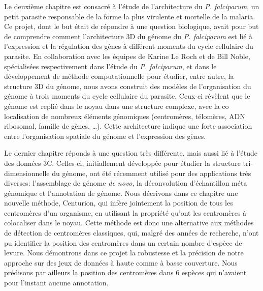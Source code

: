 \begin{resumes}
Le deuxième chapitre est consacré à l'étude de l'architecture du {\em P.
falciparum}, un petit parasite responsable de la forme la plus virulente et
mortelle de la malaria. Ce projet, dont le but était de répondre à une
question biologique, avait pour but de comprendre comment l'architecture 3D du
génome du {\em P. falciparum} est lié à l'expression et la régulation des
gènes à différent moments du cycle cellulaire du parasite. En collaboration
avec les équipes de Karine Le Roch et de Bill Noble, spécialisées
respectivement dans l'étude du {\em P. falciparum}, et dans le développement
de méthode computationnelle pour étudier, entre autre, la structure 3D du
génome, nous avons construit des modèles de l'organisation du génome à trois
moments du cycle cellulaire du parasite. Ceux-ci révèlent que le génome est
replié dans le noyau dans une structure complexe, avec la co localisation de
nombreux éléments génomiques (centromères, télomères, ADN ribosomal, famille
de gènes, \dots). Cette architecture indique une forte association entre
l'organisation spatiale du génome et l'expression des gènes.

Le dernier chapitre réponds à une question très différente, mais aussi lié à
l'étude des données 3C. Celles-ci, initiallement développée pour étudier la
structure tri-dimensionnelle du génome, ont été récemment utilisé pour des
applications très diverses: l'assemblage de génome {\em de novo}, la
déconvolution d'échantillon méta génomique et l'annotation de génome. Nous
décrivons dans ce chapitre une nouvelle méthode, Centurion, qui infère
jointement la position de tous les centromères d'un organisme, en utilisant la
propriété qu'ont les centromères à colocaliser dans le noyau. Cette méthode
est donc une alternative aux méthodes de détection de centromères classiques,
qui, malgré des années de recherche, n'ont pu identifier la position des
centromères dans un certain nombre d'espèce de levure. Nous démontrons dans ce
projet la robustesse et la précision de notre approche sur des jeux de données
à haute comme à basse couverture. Nous prédisons par ailleurs la position des
centromères dans 6 espèces qui n'avaient pour l'instant aucune annotation.

\end{resumes}


